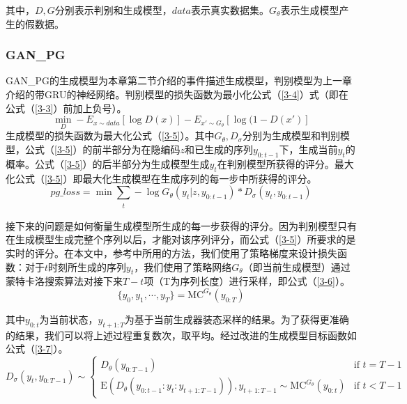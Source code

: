 \documentclass[]{template}
\begin{document}
其中，$D,G$分别表示判别和生成模型，$data$表示真实数据集。$G_\theta$表示生成模型产生的假数据。
\subsubsection{GAN\_PG}
GAN\_PG的生成模型为本章第二节介绍的事件描述生成模型，判别模型为上一章介绍的带GRU的神经网络。判别模型的损失函数为最小化公式（\ref{3-4}）式（即在公式（\ref{3-3}）前加上负号）。
\begin{equation}\label{3-4}
    \mathop{min}_D-E_{x\sim data}[\log D(x)]-E_{x'\sim G_\theta}[\log(1-D(x')]
\end{equation}
生成模型的损失函数为最大化公式（\ref{3-5}）。其中$G_\theta,D_\sigma$分别为生成模型和判别模型，公式（\ref{3-5}）的前半部分为在隐编码$z$和已生成的序列$y_{0:t-1}$下，生成当前$y_t$的概率。公式（\ref{3-5}）的后半部分为生成模型生成$y_t$在判别模型所获得的评分。最大化公式（\ref{3-5}）即最大化生成模型在生成序列的每一步中所获得的评分。
\begin{equation}\label{3-5}
pg\_loss=\mathop{min}\sum_{\substack{t}}-\log G_\theta (y_t|z,y_{0:t-1})*D_\sigma (y_t,y_{0:t-1})
\end{equation}

接下来的问题是如何衡量生成模型所生成的每一步获得的评分。因为判别模型只有在生成模型生成完整个序列以后，才能对该序列评分，而公式（\ref{3-5}）所要求的是实时的评分。在本文中，参考\cite{yu_seqgan:_2016}中所用的方法，我们使用了策略梯度来设计损失函数：对于$t$时刻所生成的序列$y_t$，我们使用了策略网络$G_\theta$（即当前生成模型）通过蒙特卡洛搜索算法对接下来$T-t$项（T为序列长度）进行采样，即公式（\ref{3-6}）。
\begin{equation}\label{3-6}
    \{y_0,y_1,\dotsb,y_T\}=\mathrm{MC}^{G_\theta}(y_{0:T})
\end{equation}

其中$y_{0:t}$为当前状态，$y_{t+1:T}$为基于当前生成器装态采样的结果。为了获得更准确的结果，我们可以将上述过程重复数次，取平均。经过改进的生成模型目标函数如公式（\ref{3-7}）。
\begin{equation}\label{3-7}
D_\sigma(y_t,y_{0:T-1})\sim 
\begin{cases}
    D_\theta(y_{0:T-1}) & \text{if } t =T-1 \\
    \mathrm{E}(D_\theta(y_{0:t-1}:y_t:y_{t+1:T-1})),y_{t+1:T-1}\sim \mathrm{MC}^{G_\theta}(y_{0:t}) & \text{if }t<T-1
\end{cases}
\end{equation}
\end{document}
